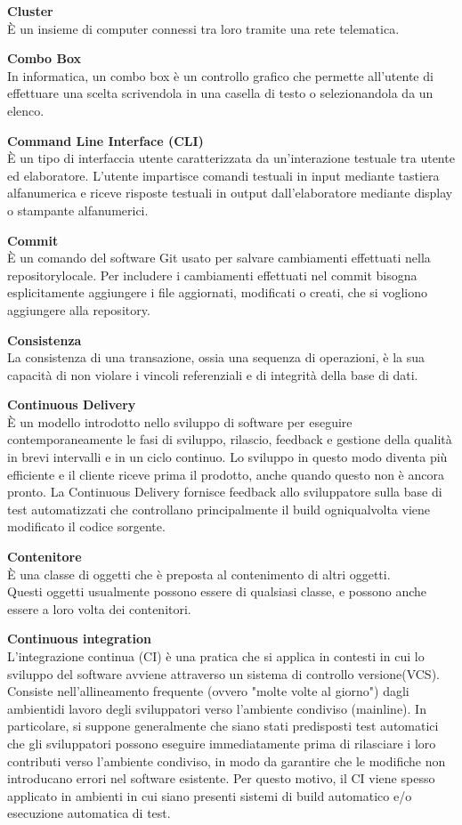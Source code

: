 \documentclass[a4paper, oneside, openany, dvipsnames, table, 12pt]{article}
\begin{document}
\textbf{Cluster} \\
È un insieme di computer connessi tra loro tramite una rete telematica.

\textbf{Combo Box} \\
In informatica, un combo box è un controllo grafico che permette all'utente di effettuare una scelta scrivendola in una casella di testo o selezionandola da un elenco. 


\textbf{Command Line Interface (CLI)} \\
È un tipo di interfaccia utente caratterizzata da un'interazione testuale tra utente ed elaboratore. L'utente impartisce comandi testuali in input mediante tastiera alfanumerica e riceve risposte testuali in output dall'elaboratore mediante display o stampante alfanumerici. 

\textbf{Commit} \\
È un comando del software Git usato per salvare cambiamenti effettuati nella repository\glo locale. Per includere i cambiamenti effettuati nel commit bisogna esplicitamente aggiungere i file aggiornati, modificati o creati, che si vogliono aggiungere alla repository.

\textbf{Consistenza} \\
La consistenza di una transazione, ossia una sequenza di operazioni, è la sua capacità di non violare i vincoli referenziali e di integrità della base di dati.

\textbf{Continuous Delivery} \\
È un modello introdotto nello sviluppo di software per eseguire contemporaneamente le fasi di sviluppo, rilascio, feedback e gestione della qualità in brevi intervalli e in un ciclo continuo. Lo sviluppo in questo modo diventa più efficiente e il cliente riceve prima il prodotto, anche quando questo non è ancora pronto. La Continuous Delivery fornisce feedback allo sviluppatore sulla base di test automatizzati che controllano principalmente il build ogniqualvolta viene modificato il codice sorgente.

\label{par:container}
\textbf{Contenitore} \\
È una classe di oggetti che è preposta al contenimento di altri oggetti. \\ 
Questi oggetti usualmente possono essere di qualsiasi classe, e possono anche essere a loro volta dei contenitori.

\textbf{Continuous integration} \\
L'integrazione continua (CI) è una pratica che si applica in contesti in cui lo sviluppo del software avviene attraverso un sistema di controllo versione\glo (VCS\glo). Consiste nell'allineamento frequente (ovvero "molte volte al giorno") dagli ambienti\glo di lavoro degli sviluppatori verso l'ambiente condiviso (mainline).
In particolare, si suppone generalmente che siano stati predisposti test automatici che gli sviluppatori possono eseguire immediatamente prima di rilasciare i loro contributi verso l'ambiente condiviso, in modo da garantire che le modifiche non introducano errori nel software esistente. Per questo motivo, il CI viene spesso applicato in ambienti in cui siano presenti sistemi di build automatico e/o esecuzione automatica di test.
\end{document}
